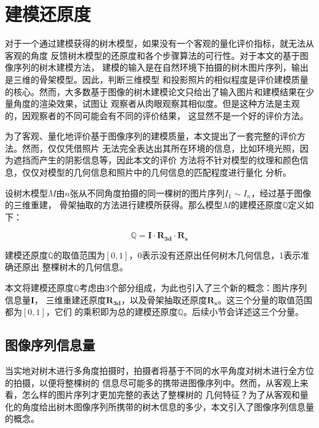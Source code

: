 
\chapter{建模还原度}
\label{sec:qualityevaluation}
对于一个通过建模获得的树木模型，如果没有一个客观的量化评价指标，就无法从客观的角度
反馈树木模型的还原度和各个步骤算法的可行性。对于本文的基于图像序列的树木建模方法，
建模的输入是在自然环境下拍摄的树木图片序列，输出是三维的骨架模型。因此，判断三维模型
和投影照片的相似程度是评价建模质量的核心。然而，大多数基于图像的树木建模论文\cite{quanlong,
tanping,lichuan,tanping2,liu}只给出了输入图片和建模结果在少量角度的渲染效果，试图让
观察者从肉眼观察其相似度。但是这种方法是主观的，因观察者的不同可能会有不同的评价结果，
这显然不是一个好的评价方法。

为了客观、量化地评价基于图像序列的建模质量，本文提出了一套完整的评价方法。然而，仅仅凭借照片
无法完全表达出其所在环境的信息，比如环境光照，因为遮挡而产生的阴影信息等，因此本文的评价
方法将不针对模型的纹理和颜色信息，仅仅对模型的几何信息和照片中的几何信息的匹配程度进行量化
分析。

设树木模型$M$由$n$张从不同角度拍摄的同一棵树的图片序列$I_1\sim I_n$，经过基于图像的三维重建，
骨架抽取的方法进行建模所获得。那么模型$M$的建模还原度$\mathbb{Q}$定义如下：\\
\begin{definition}
	\[\mathbb{Q}=\mathbf{I}\cdot\mathbf{R_{3d}}\cdot\mathbf{R_s}\]
\end{definition}

建模还原度$\mathbb{Q}$的取值范围为$[0,1]$，0表示没有还原出任何树木几何信息，1表示准确还原出
整棵树木的几何信息。

本文将建模还原度$\mathbb{Q}$考虑由3个部分组成，为此也引入了三个新的概念：图片序列信息量$\mathbf{I}$，
三维重建还原度$\mathbf{R_{3d}}$，以及骨架抽取还原度$\mathbf{R_s}$。这三个分量的取值范围都为$[0,1]$，它们
的乘积即为总的建模还原度$\mathbb{Q}$。后续小节会详述这三个分量。

\section{图像序列信息量}
当实地对树木进行多角度拍摄时，拍摄者将基于不同的水平角度对树木进行全方位的拍摄，以便将整棵树的
信息尽可能多的携带进图像序列中。然而，从客观上来看，怎么样的图片序列才更加完整的表达了整棵树的
几何特征？为了从客观和量化的角度给出树木图像序列所携带的树木信息的多少，本文引入了图像序列信息量的概念。

